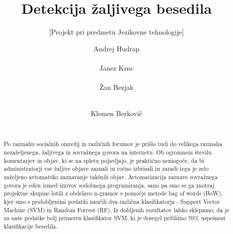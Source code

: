 \documentclass{acm_proc_article-sp}
\begin{document}
\title{Detekcija žaljivega besedila}
\subtitle{[Projekt pri predmetu Jezikovne tehnologije]}


\author{
\alignauthor Andrej Hudrap\\
       \\
\alignauthor Janez Krnc\\
       \\
\alignauthor Žan Bezjak\\
       \\
\and
\alignauthor Klemen Berkovič\\
       \\
}
\maketitle

\begin{abstract}
Po razmahu socialnih omrežij in različnih forumov je prišlo tudi do velikega razmaha nezaželjenega, žaljivega in sovražnega govora na internetu. Ob ogromnem številu komentarjev in objav, ki se na spletu pojavljajo, je praktično nemogoče, da bi administratorji vse žaljive objave zaznali in ročno izbrisali in zaradi tega je zelo zaželjeno avtomatsko zaznavanje takšnih objav. Avtomatizacija zaznave sovražnega govora je eden izmed izzivov sodobnega programiranja, sami pa smo se ga znotraj projektne skupine lotili z obdelavo n-gramov s pomočje metode bag of words (BoW), kjer smo s pridobljenimi podatki naučili dva različna klasifikatorja - Support Vector Machine (SVM) in Random Forrest (RF). Iz dobljenih rezultatov lahko sklepamo, da je za naše podatke bolj primeren klasifikator SVM, ki je dosegel približno 70\% uspešnost klasifikacije besedila.
\end{abstract}
\end{document}
